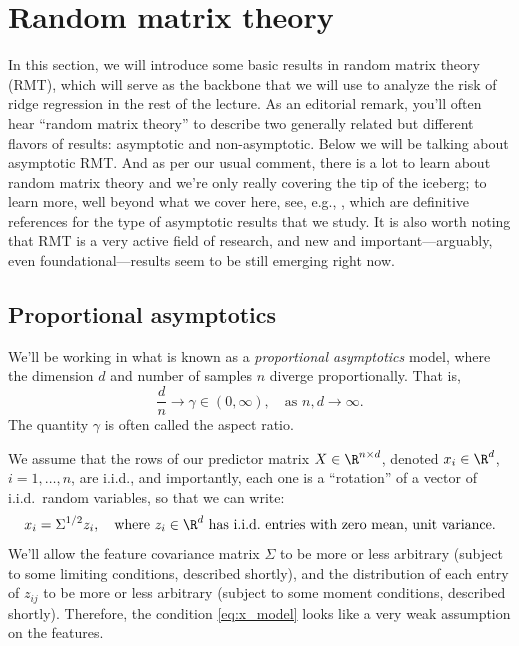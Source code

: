 \documentclass{article}
\begin{document}
\section{Random matrix theory}

In this section, we will introduce some basic results in random matrix theory
(RMT), which will serve as the backbone that we will use to analyze the risk of
ridge regression in the rest of the lecture. As an editorial remark, you'll
often hear ``random matrix theory'' to describe two generally related but
different flavors of results: asymptotic and non-asymptotic. Below we will be
talking about asymptotic RMT. And as per our usual comment, there is a lot to 
learn about random matrix theory and we're only really covering the tip of the
iceberg; to learn more, well beyond what we cover here, see, e.g.,
\citet{tulino2004random, bai2010spectral}, which are definitive references for
the type of asymptotic results that we study. It is also worth noting that RMT
is a very active field of research, and new and important---arguably, even
foundational---results seem to be still emerging right now.   

\subsection{Proportional asymptotics}

We'll be working in what is known as a \emph{proportional asymptotics} model,
where the dimension $d$ and number of samples $n$ diverge proportionally. That 
is,
\[
\frac{d}{n} \to \gamma \in (0,\infty), \quad \text{as $n,d \to \infty$}. 
\]
The quantity $\gamma$ is often called the aspect ratio.

We assume that the rows of our predictor matrix $X \in \R^{n \times d}$, denoted 
$x_i \in \R^d$, $i=1,\dots,n$, are i.i.d., and importantly, each one is a
``rotation'' of a vector of i.i.d.\ random variables, so that we can write:   
\begin{equation}
\label{eq:x_model}
x_i = \Sigma^{1/2} z_i, \quad \text{where $z_i \in \R^d$ has i.i.d.\ entries
  with zero mean, unit variance.} 
\end{equation}
We'll allow the feature covariance matrix $\Sigma$ to be more or less arbitrary 
(subject to some limiting conditions, described shortly), and the distribution
of each entry of $z_{ij}$ to be more or less arbitrary (subject to some moment
conditions, described shortly). Therefore, the condition \eqref{eq:x_model}
looks like a very weak assumption on the features.  
\end{document}
